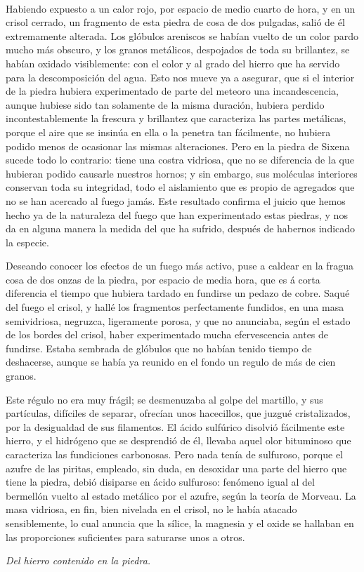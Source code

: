 \documentclass[a4paper, 11pt, oneside, polutonikogreek, spanish]{article}
\begin{document}
\paragraph{}
Habiendo expuesto a un calor rojo, por espacio de medio cuarto de hora, y en un crisol cerrado, un fragmento de esta piedra de cosa de dos pulgadas, salió de él extremamente alterada. Los glóbulos areniscos se habían vuelto de un color pardo mucho más obscuro, y los granos metálicos, despojados de toda su brillantez, se habían oxidado visiblemente: con el color y al grado del hierro que ha servido para la descomposición del agua. Esto nos mueve ya a asegurar, que si el interior de la piedra hubiera experimentado de parte del meteoro una incandescencia, aunque hubiese sido tan solamente de la misma duración, hubiera perdido incontestablemente la frescura y brillantez que caracteriza las partes metálicas, porque el aire que se insinúa en ella o la penetra tan fácilmente, no hubiera podido menos de ocasionar las mismas alteraciones. Pero en la piedra de Sixena sucede todo lo contrario: tiene una costra vidriosa, que no se diferencia de la que hubieran podido causarle nuestros hornos; y sin embargo, sus moléculas interiores conservan toda su integridad, todo el aislamiento que es propio de agregados que no se han acercado al fuego jamás. Este resultado confirma el juicio que hemos hecho ya de la naturaleza del fuego que han experimentado estas piedras, y nos da en alguna manera la medida del que ha sufrido, después de habernos indicado la especie.

Deseando conocer los efectos de un fuego más activo, puse a caldear en la fragua cosa de dos onzas de la piedra, por espacio de media hora, que es á corta diferencia el tiempo que hubiera tardado en fundirse un pedazo de cobre. Saqué del fuego el crisol, y hallé los fragmentos perfectamente fundidos, en una masa semividriosa, negruzca, ligeramente porosa, y que no anunciaba, según el estado de los bordes del crisol, haber experimentado mucha efervescencia antes de fundirse. Estaba sembrada de glóbulos que no habían tenido tiempo de deshacerse, aunque se había ya reunido en el fondo un regulo de más de cien granos.

Este régulo no era muy frágil; se desmenuzaba al golpe del martillo, y sus partículas, difíciles de separar, ofrecían unos hacecillos, que juzgué cristalizados, por la desigualdad de sus filamentos. El ácido sulfúrico disolvió fácilmente este hierro, y el hidrógeno que se desprendió de él, llevaba aquel olor bituminoso que caracteriza las fundiciones carbonosas. Pero nada tenía de sulfuroso, porque el azufre de las piritas, empleado, sin duda, en desoxidar una parte del hierro que tiene la piedra, debió disiparse en ácido sulfuroso: fenómeno igual al del bermellón vuelto al estado metálico por el azufre, según la teoría de Morveau. La masa vidriosa, en fin, bien nivelada en el crisol, no le había atacado sensiblemente, lo cual anuncia que la sílice, la magnesia y el oxide se hallaban en las proporciones suficientes para saturarse unos a otros.
\begin{center}
\emph{Del hierro contenido en la piedra.}
\end{center}
\end{document}
